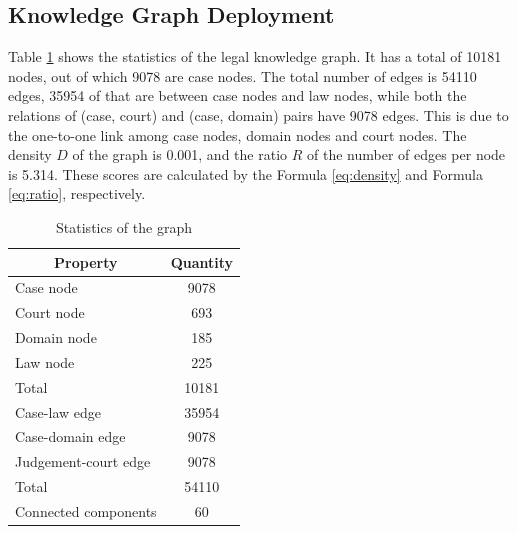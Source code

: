 \documentclass[conference]{IEEEtran}
\begin{document}
\subsection{Knowledge Graph Deployment}
Table \ref{tab:stat} shows the statistics of the legal knowledge graph. It has a total of 10181 nodes, out of which 9078 are case nodes. The total number of edges is 54110 edges, 35954 of that are between case nodes and law nodes, while both the relations of (case, court) and (case, domain) pairs have 9078 edges. This is due to the one-to-one link among case nodes, domain nodes and court nodes. The density $D$ of the graph is 0.001, and the ratio $R$ of the number of edges per node is 5.314. These scores are calculated by the Formula \ref{eq:density} and Formula \ref{eq:ratio}, respectively. 

\begin{table}[ht]
\caption{Statistics of the graph}
\label{tab:stat}
\centering
\begin{tabular}{|l|c|}
\hline
\multicolumn{1}{|c|}{\textbf{Property}} & \multicolumn{1}{c|}{\textbf{Quantity}} \\ \hline
Case node                           & 9078                                   \\
Court node                              & 693                                    \\
Domain node                             & 185                                    \\
Law node                                & 225                                    \\
Total                                   & 10181                                  \\ \hline
Case-law edge                       & 35954                                  \\
Case-domain edge                    & 9078                                   \\
Judgement-court edge                    & 9078                                   \\
Total                                   & 54110                                  \\ \hline
Connected components                    & 60                                    \\ \hline
\end{tabular}
\end{table}
\end{document}
